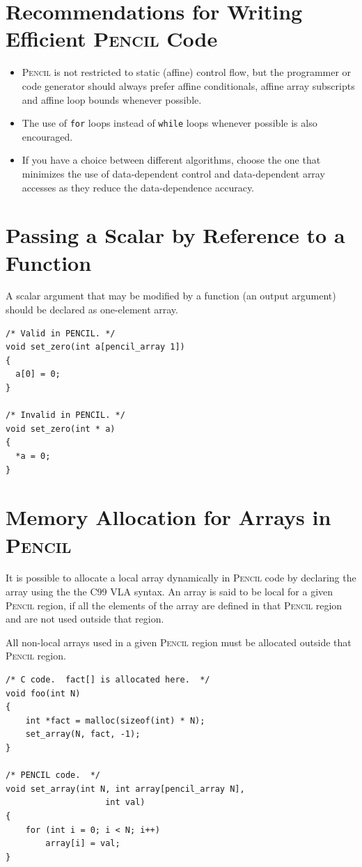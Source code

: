 \documentclass{carp}
\newcommand\pencil{\textsc{Pencil}\xspace}
\begin{document}
\section{Recommendations for Writing Efficient \pencil Code}

\begin{itemize}
\item \pencil is not restricted to static (affine) control flow, but
  the programmer or code generator should always prefer affine
  conditionals, affine array subscripts and affine loop bounds
  whenever possible.
\item The use of \lstinline!for! loops instead of \lstinline!while!
  loops whenever possible is also encouraged.
\item If you have a choice between different algorithms, choose the
  one that minimizes the use of data-dependent control and
  data-dependent array accesses as they reduce the data-dependence
  accuracy.
\end{itemize}

\section{Passing a Scalar by Reference to a Function}

A scalar argument that may be modified by a function (an output argument)
should be declared as one-element array.

\begin{lstlisting}[language=pencil]
/* Valid in PENCIL. */
void set_zero(int a[pencil_array 1])
{
  a[0] = 0;
}

/* Invalid in PENCIL. */
void set_zero(int * a)
{
  *a = 0;
}
\end{lstlisting}  

\section{Memory Allocation for Arrays in \pencil}

It is possible to allocate a local array dynamically in \pencil code
by declaring the array using the the C99 VLA syntax.
An array is said to be local for a given \pencil region, if all the
elements of the array are defined in that \pencil region and are not
used outside that region.

All non-local arrays used in a given \pencil region must be allocated
outside that \pencil region.

\begin{lstlisting}[language=pencil]
/* C code.  fact[] is allocated here.  */
void foo(int N)
{
    int *fact = malloc(sizeof(int) * N);
    set_array(N, fact, -1);
}

/* PENCIL code.  */
void set_array(int N, int array[pencil_array N],
                    int val)
{
    for (int i = 0; i < N; i++)
        array[i] = val;
}

\end{lstlisting}
\end{document}
